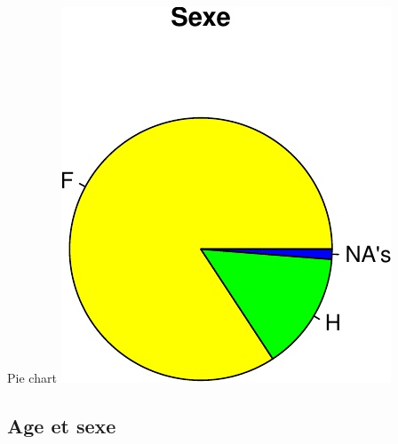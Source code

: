 \documentclass[]{article}
\begin{document}
Pie chart
\includegraphics{qs_etudiants_files/figure-latex/pie_sexe-1.pdf}

\subsection{Age et sexe}\label{age-et-sexe}
\end{document}
